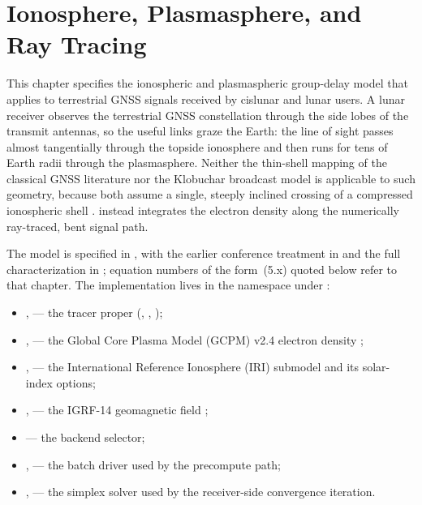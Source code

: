 \chapter{Ionosphere, Plasmasphere, and Ray Tracing}
\label{chap:ionosphere}

This chapter specifies the ionospheric and plasmaspheric group-delay model that
\lupnt{} applies to terrestrial GNSS signals received by cislunar and lunar
users.  A lunar receiver observes the terrestrial GNSS constellation through the
side lobes of the transmit antennas, so the useful links graze the Earth: the
line of sight passes almost tangentially through the topside ionosphere and then
runs for tens of Earth radii through the plasmasphere.  Neither the thin-shell
mapping of the classical GNSS literature nor the Klobuchar broadcast model is applicable
to such geometry, because both assume a single, steeply inclined crossing of a
compressed ionospheric shell \citep{misra2011gnss}.  \lupnt{} instead integrates
the electron density along the numerically ray-traced, bent signal path.

The model is specified in \citep{iiyama2026gcpm}, with the earlier conference
treatment in \citep{iiyama2025iono} and the full characterization in
\citep[Ch.~5]{iiyama2026thesis}; equation numbers of the form~(5.x) quoted below
refer to that chapter.  The implementation lives in the  namespace
under :

\begin{itemize}[nosep]
  \item {},  --- the tracer proper
        (, , );
  \item {},  --- the
        Global Core Plasma Model (GCPM) v2.4 electron density
        \citep{gallagher2000gcpm};
  \item {},  --- the
        International Reference Ionosphere (IRI) submodel
        \citep{bilitza2022iri} and its solar-index options;
  \item {},  --- the
        IGRF-14 geomagnetic field \citep{alken2021igrf};
  \item {} --- the  backend selector;
  \item {},  --- the
        batch driver used by the precompute path;
  \item {},  --- the simplex solver
        used by the receiver-side convergence iteration.
\end{itemize}

